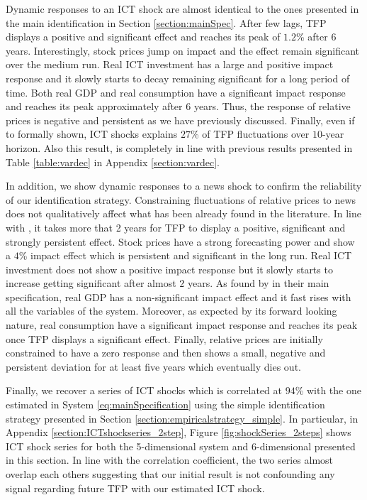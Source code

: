 \documentclass[12pt]{article}
\begin{document}
Dynamic responses to an ICT shock are almost identical to the ones presented in the main identification in Section \ref{section:mainSpec}. After few lags, TFP displays a positive and significant effect and reaches its peak of $1.2$\% after $6$ years. Interestingly, stock prices jump on impact and the effect remain significant over the medium run. Real ICT investment has a large and positive impact response and it slowly starts to decay remaining significant for a long period of time. Both real GDP and real consumption have a significant impact response and reaches its peak approximately after $6$ years. Thus, the response of relative prices is negative and persistent as we have previously discussed. Finally, even if to formally shown, ICT shocks explains $27$\% of TFP fluctuations over $10$-year horizon. Also this result, is completely in line with previous results presented in Table \ref{table:vardec} in Appendix \ref{section:vardec}.

In addition, we show dynamic responses to a news shock to confirm the reliability of our identification strategy. Constraining fluctuations of relative prices to news does not qualitatively affect what has been already found in the literature. In line with \cite{barsky2011news}, it takes more that 2 years for TFP to display a positive, significant and strongly persistent effect. Stock prices have a strong forecasting power and show a $4$\% impact effect which is persistent and significant in the long run. Real ICT investment does not show a positive impact response but it slowly starts to increase getting significant after almost $2$ years. As found by \cite{barsky2011news} in their main specification, real GDP has a non-significant impact effect and it fast rises with all the variables of the system. Moreover, as expected by its forward looking nature, real consumption have a significant impact response and reaches its peak once TFP displays a significant effect. Finally, relative prices are initially constrained to have a zero response and then shows a small, negative and persistent deviation for at least five years which eventually dies out.

Finally, we recover a series of ICT shocks which is correlated at $94$\% with the one estimated in System \ref{eq:mainSpecification} using the simple identification strategy presented in Section \ref{section:empiricalstrategy_simple}. In particular, in Appendix \ref{section:ICTshockseries_2step}, Figure \ref{fig:shockSeries_2steps} shows ICT shock series for both the 5-dimensional system and 6-dimensional presented in this section. In line with the correlation coefficient, the two series almost overlap each others suggesting that our initial result is not confounding any signal regarding future TFP with our estimated ICT shock. 
\end{document}
